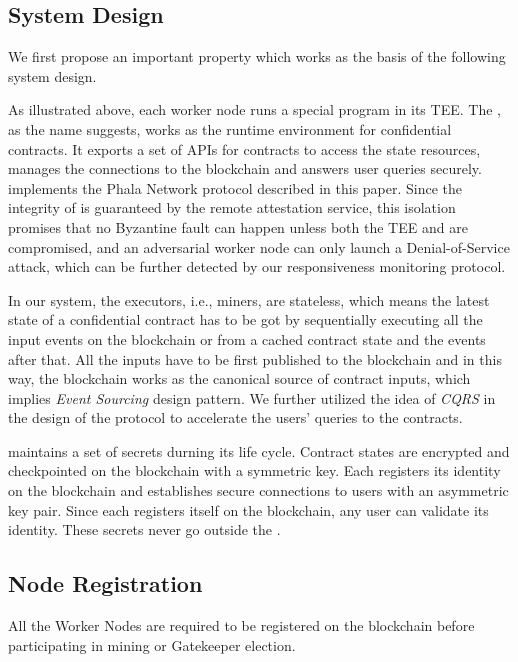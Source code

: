 \subsection{System Design}

We first propose an important property which works as the basis of the following system design.

As illustrated above, each worker node runs a special program \pruntime in its TEE. The \pruntime, as the name suggests, works as the runtime environment for confidential contracts. It exports a set of APIs for contracts to access the state resources, manages the connections to the blockchain and answers user queries securely.
\pruntime implements the Phala Network protocol described in this paper. Since the integrity of \pruntime is guaranteed by the remote attestation service, this isolation promises that no Byzantine fault can happen unless both the TEE and \pruntime are compromised, and an adversarial worker node can only launch a Denial-of-Service attack, which can be further detected by our responsiveness monitoring protocol.

In our system, the executors, i.e., miners, are stateless, which means the latest state of a confidential contract has to be got by sequentially executing all the input events on the blockchain or from a cached contract state and the events after that. All the inputs have to be first published to the blockchain and in this way, the blockchain works as the canonical source of contract inputs, which implies \textit{Event Sourcing} design pattern. We further utilized the idea of \textit{CQRS} in the design of the protocol to accelerate the users' queries to the contracts.

\pruntime maintains a set of secrets durning its life cycle. Contract states are encrypted and checkpointed on the blockchain with a symmetric key. Each \pruntime registers its identity on the blockchain and establishes secure connections to users with an asymmetric key pair. Since each \pruntime registers itself on the blockchain, any user can validate its identity. These secrets never go outside the \pruntime.



\subsection{Node Registration}

All the Worker Nodes are required to be registered on the blockchain before participating in mining or Gatekeeper election.

